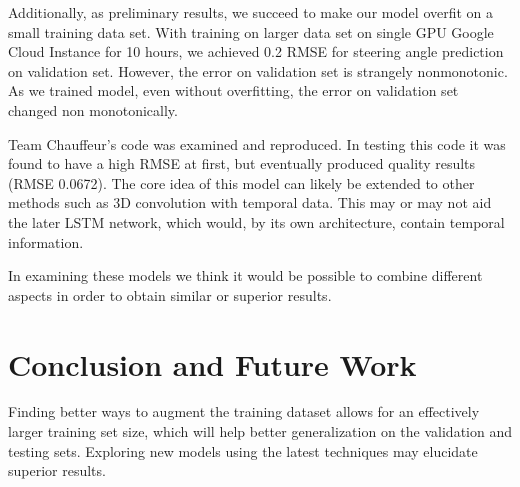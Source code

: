 \documentclass[10pt,twocolumn,letterpaper]{article}
\begin{document}
Additionally, as preliminary results, we succeed to make our model overfit on a small training data set. With training on larger data set on single GPU Google Cloud Instance for 10 hours, we achieved 0.2 RMSE for steering angle prediction on validation set. However, the error on validation set is strangely nonmonotonic. As we trained model, even without overfitting, the error on validation set changed non monotonically.

Team Chauffeur's code was examined and reproduced. In testing this code it was found to have a high RMSE at first, but eventually produced quality results (RMSE 0.0672). The core idea of this model can likely be extended to other methods such as 3D convolution with temporal data. This may or may not aid the later LSTM network, which would, by its own architecture, contain temporal information.

In examining these models we think it would be possible to combine different aspects in order to obtain similar or superior results. 


\section{Conclusion and Future Work}
Finding better ways to augment the training dataset allows for an effectively larger training set size, which will help better generalization on the validation and testing sets. Exploring new models using the latest techniques may elucidate superior results.


{\small


}
\end{document}
